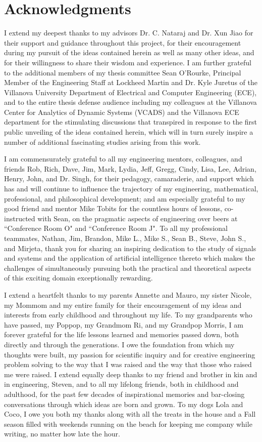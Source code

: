 \chapter*{Acknowledgments}

I extend my deepest thanks to my advisors Dr. C. Nataraj and Dr. Xun Jiao for their support and guidance throughout this project, for their encouragement during my pursuit of the ideas contained herein as well as many other ideas, and for their willingness to share their wisdom and experience.  I am further grateful to the additional members of my thesis committee Sean O'Rourke, Principal Member of the Engineering Staff at Lockheed Martin and Dr. Kyle Juretus of the Villanova University Department of Electrical and Computer Engineering (ECE), and to the entire thesis defense audience including my colleagues at the Villanova Center for Analytics of Dynamic Systems (VCADS) and the Villanova ECE department for the stimulating discussions that transpired in response to the first public unveiling of the ideas contained herein, which will in turn surely inspire a number of additional fascinating studies arising from this work.

I am commensurately grateful to all my engineering mentors, colleagues, and friends Rob, Rich, Dave, Jim, Mark, Lydia, Jeff, Gregg, Cindy, Lisa, Lee, Adrian, Henry, John, and Dr. Singh, for their pedagogy, camaraderie, and support which has and will continue to influence the trajectory of my engineering, mathematical, professional, and philosophical development; and am especially grateful to my good friend and mentor Mike Tobits for the countless hours of lessons, co-instructed with Sean, on the pragmatic aspects of engineering over beers at ``Conference Room O" and ``Conference Room J".  To all my professional teammates, Nathan, Jim, Brandon, Mike L., Mike S., Sean B., Steve, John S., and Mirjeta, thank you for sharing an inspiring dedication to the study of signals and systems and the application of artificial intelligence thereto which makes the challenges of simultaneously pursuing both the practical and theoretical aspects of this exciting domain exceptionally rewarding.

I extend a heartfelt thanks to my parents Annette and Mauro, my sister Nicole, my Mommom and my entire family for their encouragement of my ideas and interests from early childhood and throughout my life.  To my grandparents who have passed, my Poppop, my Grandmom Ri, and my Grandpop Morris, I am forever grateful for the life lessons learned and memories passed down, both directly and through the generations.  I owe the foundation from which my thoughts were built, my passion for scientific inquiry and for creative engineering problem solving to the way that I was raised and the way that those who raised me were raised.  I extend equally deep thanks to my friend and brother in kin and in engineering, Steven, and to all my lifelong friends, both in childhood and adulthood, for the past few decades of inspirational memories and bar-closing conversations through which ideas are born and grown.  To my dogs Lola and Coco, I owe you both my thanks along with all the treats in the house and a Fall season filled with weekends running on the beach for keeping me company while writing, no matter how late the hour.

